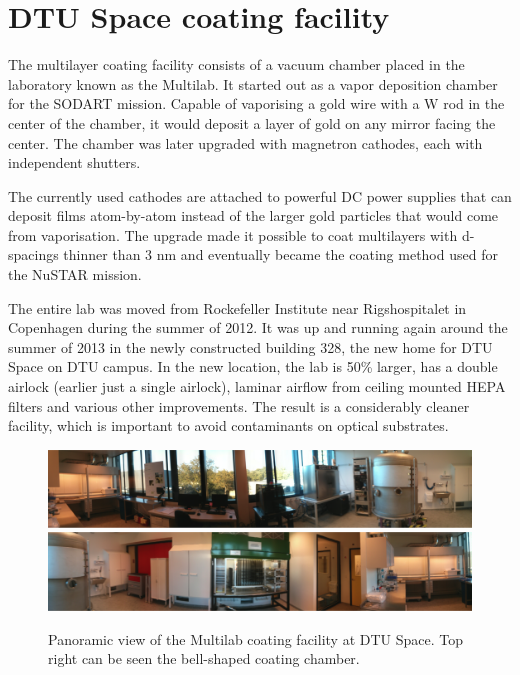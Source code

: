 \chapter{DTU Space coating facility}\label{chap:coating_facility}
The multilayer coating facility consists of a vacuum chamber placed in the laboratory known as the Multilab. It started out as a vapor deposition chamber for the SODART mission\cite{Christensen:1997kk,Schnopper:1994ip}. Capable of vaporising a gold wire with a W rod in the center of the chamber, it would deposit a layer of gold on any mirror facing the center. The chamber was later upgraded with magnetron cathodes, each with independent shutters.

The currently used cathodes are attached to powerful DC power supplies that can deposit films atom-by-atom instead of the larger gold particles that would come from vaporisation. The upgrade made it possible to coat multilayers with d-spacings thinner than 3 nm and eventually became the coating method used for the NuSTAR mission.

The entire lab was moved from Rockefeller Institute near Rigshospitalet in Copenhagen during the summer of 2012. It was up and running again around the summer of 2013 in the newly constructed building 328, the new home for DTU Space on DTU campus. In the new location, the lab is 50\% larger, has a double airlock (earlier just a single airlock), laminar airflow from ceiling mounted HEPA filters and various other improvements. The result is a considerably cleaner facility, which is important to avoid contaminants on optical substrates.

\begin{figure}[htbp]
  \centering
  \includegraphics[width=\linewidth]{figures/chamber/multilab1.png}
  \includegraphics[width=\linewidth]{figures/chamber/multilab2.png}
  \caption{\footnotesize Panoramic view of the Multilab coating facility at DTU Space. Top right can be seen the bell-shaped coating chamber.}
  \label{fig:multilab}
\end{figure}

